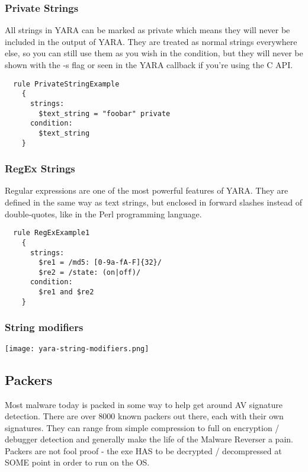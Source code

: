 \subsubsection{Private Strings}
All strings in YARA can be marked as private which means they will never be included in the output of YARA. 
They are treated as normal strings everywhere else, so you can still use them as you wish in the condition, but they will never be shown with the -s flag or seen in the YARA callback if you're using the C API.
\begin{lstlisting}
  rule PrivateStringExample
    {
      strings:
        $text_string = "foobar" private
      condition:
        $text_string
    }
\end{lstlisting}

\subsubsection{RegEx Strings}
Regular expressions are one of the most powerful features of YARA. 
They are defined in the same way as text strings, but enclosed in forward slashes instead of double-quotes, like in the Perl programming language.
\begin{lstlisting}
  rule RegExExample1
    {
      strings:
        $re1 = /md5: [0-9a-fA-F]{32}/
        $re2 = /state: (on|off)/
      condition:
        $re1 and $re2
    }
\end{lstlisting}

\subsubsection{String modifiers}
\texttt{[image: yara-string-modifiers.png]}

\subsection{Packers}
Most malware today is packed in some way to help get around AV signature detection.
There are over 8000 known packers out there, each with their own signatures.
They can range from simple compression to full on encryption / debugger detection and generally make the life of the Malware Reverser a pain.
Packers are not fool proof - the exe HAS to be decrypted / decompressed at SOME point in order to run on the OS.